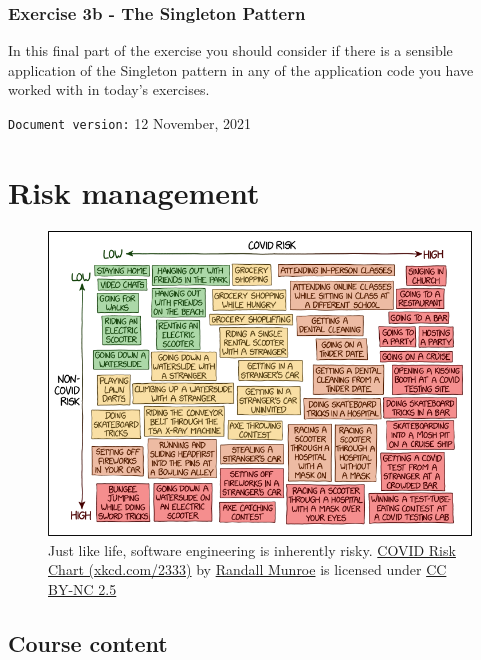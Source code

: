 \documentclass[
]{book}
\begin{document}
\hypertarget{singleton}{%
\subsection{Exercise 3b - The Singleton Pattern}\label{singleton}}

In this final part of the exercise you should consider if there is a sensible application of the Singleton pattern in any of the application code you have worked with in today's exercises.

\texttt{Document\ version:} 12 November, 2021

\hypertarget{risking}{%
\chapter{Risk management}\label{risking}}

\begin{figure}

{\centering \includegraphics[width=0.99\linewidth]{images/covid_risk_chart} 

}

\caption{Just like life, software engineering is inherently risky. \href{https://xkcd.com/2333/}{COVID Risk Chart (xkcd.com/2333)} by \href{https://en.wikipedia.org/wiki/Randall_Munroe}{Randall Munroe} is licensed under \href{https://creativecommons.org/licenses/by-nc/2.5/}{CC BY-NC 2.5}}\label{fig:xkcd-risk-fig}
\end{figure}



\hypertarget{course-content-2}{%
\section{Course content}\label{course-content-2}}
\end{document}
